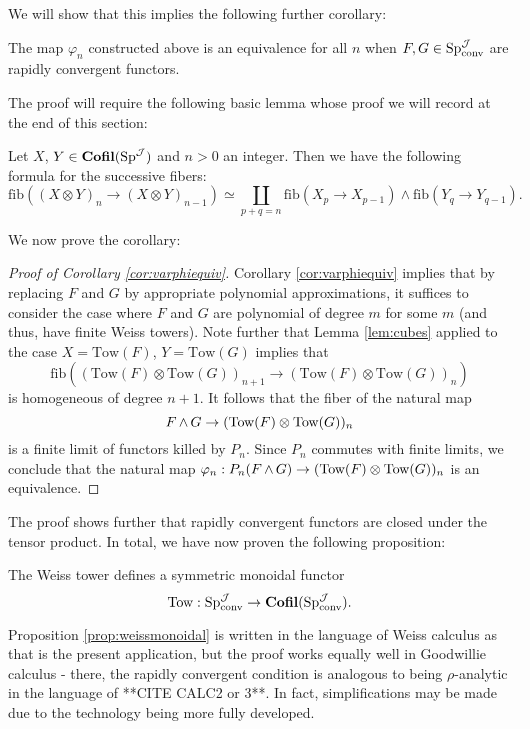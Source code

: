 We will show that this implies the following further corollary:

\begin{cor}\label{cor:varphiequiv}
The map $\varphi_n$ constructed above is an equivalence for all $n$ when $F,G\in \operatorname{\text{Sp}}^{\operatorname{\mathcal{J}}}_{\text{conv}}$ are rapidly convergent functors.  
\end{cor}
The proof will require the following basic lemma whose proof we will record at the end of this section: 
\begin{lem}\label{lem:cubes}
Let $X$, $Y \in \operatorname{\textbf{Cofil}}(\operatorname{\text{Sp}}^{\operatorname{\mathcal{J}}})$ and $n>0$ an integer.  Then we have the following formula for the successive fibers: $$\text{fib}((X\otimes Y)_{n} \to (X\otimes Y)_{n-1}) \simeq \coprod_{p+q=n} \text{fib}(X_p\to X_{p-1}) \wedge \text{fib}(Y_q \to Y_{q-1}).$$
\end{lem}

We now prove the corollary:

\begin{proof}[Proof of Corollary \ref{cor:varphiequiv}]
Corollary \ref{cor:varphiequiv} implies that by replacing $F$ and $G$ by appropriate polynomial approximations, it suffices to consider the case where $F$ and $G$ are polynomial of degree $m$ for some $m$ (and thus, have finite Weiss towers).   Note further that Lemma \ref{lem:cubes} applied to the case $X = \text{Tow}(F)$, $Y=\text{Tow}(G)$ implies that $$\text{fib}((\text{Tow}(F)\otimes \text{Tow}(G) )_{n+1} \to (\text{Tow}(F) \otimes \text{Tow}(G))_n)$$ is homogeneous of degree $n+1$.  It follows that the fiber of the natural map $$F\operatorname{\wedge} G \to (\text{Tow}(F)\otimes \text{Tow}(G))_n$$  is a finite limit of functors killed by $P_n$.  Since $P_n$ commutes with finite limits, we conclude that the natural map $\varphi_n: P_n(F\operatorname{\wedge} G)\to (\text{Tow}(F)\otimes \text{Tow}(G))_n$ is an equivalence.  
\end{proof}

The proof shows further that rapidly convergent functors are closed under the tensor product.  In total, we have now proven the following proposition:

\begin{prop}\label{prop:weissmonoidal}
The Weiss tower defines a symmetric monoidal functor $$\text{Tow}: \operatorname{\text{Sp}}^{\operatorname{\mathcal{J}}}_{\text{conv}} \to \operatorname{\textbf{Cofil}}(\operatorname{\text{Sp}}^{\operatorname{\mathcal{J}}}_{\text{conv}}).$$
\end{prop}
\begin{rmk}
Proposition \ref{prop:weissmonoidal} is written in the language of Weiss calculus as that is the present application, but the proof works equally well in Goodwillie calculus - there, the rapidly convergent condition is analogous to being $\rho$-analytic in the language of **CITE CALC2 or 3**.  In fact, simplifications may be made due to the technology being more fully developed.  
\end{rmk}


